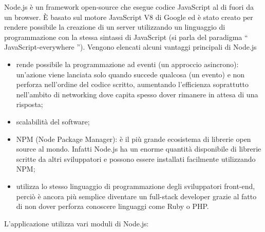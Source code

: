 \documentclass[12pt]{report}
\begin{document}
Node.js è un framework open-source che esegue codice JavaScript al di fuori da un browser. È basato sul motore JavaScript V8 di Google ed è stato creato per rendere possibile la creazione di un server utilizzando un linguaggio di programmazione con la stessa sintassi di JavaScript (si parla del paradigma \textquotedblleft{} JavaScript-everywhere \textquotedblright{}). Vengono elencati alcuni vantaggi principali di Node.js

\begin{itemize}
	\item rende possibile la programmazione ad eventi (un approccio asincrono): un'azione viene lanciata solo quando succede qualcosa (un evento) e non perforza nell'ordine del codice scritto, aumentando l'efficienza soprattutto nell'ambito di networking dove capita spesso dover rimanere in attesa di una risposta;
	\item scalabilità del software;
	\item NPM (Node Package Manager): è il più grande ecosistema di librerie open source al mondo. Infatti Node.js ha un enorme quantità disponibile di librerie scritte da altri sviluppatori e possono essere installati facilmente utilizzando NPM;
	\item utilizza lo stesso linguaggio di programmazione degli sviluppatori front-end, perciò è ancora più semplice diventare un full-stack developer grazie al fatto di non dover perforza conoscere linguaggi come Ruby o PHP.
\end{itemize}
L'applicazione utilizza vari moduli di Node.js:
\end{document}
